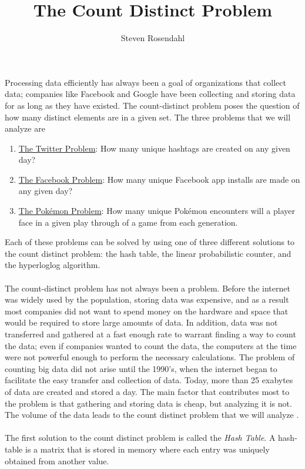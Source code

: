 \documentclass{article}
\title{The Count Distinct Problem}
\author{Steven Rosendahl}
\date{}
\begin{document}
\maketitle
\indent Processing data efficiently has always been a goal of organizations that collect data; companies like Facebook and Google have been collecting and storing data for as long as they have existed. 
The count-distinct problem poses the question of how many distinct elements are in a given set. 
The three problems that we will analyze are
\begin{enumerate}
\item \underline{The Twitter Problem}: How many unique hashtags are created on any given day?
\item \underline{The Facebook Problem}: How many unique Facebook app installs are made on any given day?
\item \underline{The Pok\'emon Problem}: How many unique Pok\'emon encounters will a player face in a given play through of a game from each generation.
\end{enumerate}
Each of these problems can be solved by using one of three different solutions to the count distinct problem: the hash table, the linear probabilistic counter, and the hyperloglog algorithm.
\\\\
\indent The count-distinct problem has not always been a problem. 
Before the internet was widely used by the population, storing data was expensive, and as a result most companies did not want to spend money on the hardware and space that would be required to store large amounts of data. 
In addition, data was not transferred and gathered at a fast enough rate to warrant finding a way to count the data; even if companies wanted to count the data, the computers at the time were not powerful enough to perform the necessary calculations. 
The problem of counting big data did not arise until the 1990's, when the internet began to facilitate the easy transfer and collection of data. 
Today, more than 25 exabytes of data are created and stored a day. 
The main factor that contributes most to the problem is that gathering and storing data is cheap, but analyzing it is not. The volume of the data leads to the count distinct problem that we will analyze \cite[pp. 1]{Yousra}.
\\\\
\indent The first solution to the count distinct problem is called the \textit{Hash Table}. 
A hash-table is a matrix that is stored in memory where each entry was uniquely obtained from another value. 
\end{document}
